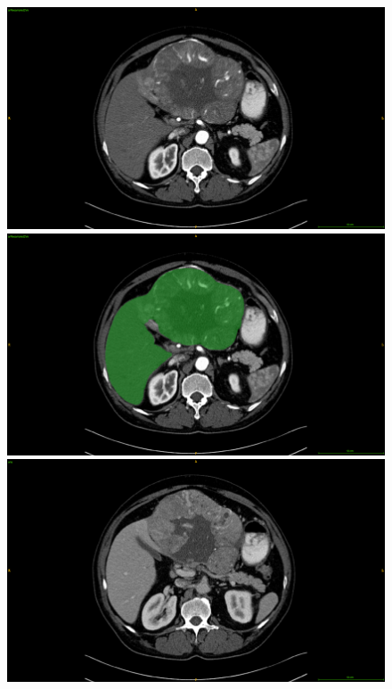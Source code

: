 \begin{figure}[ht!]
	\centering
	\begin{minipage}{0.45\linewidth}
		\includegraphics[width=0.9\linewidth]{../HistologicalGradePrediction/images/ResizeTCIA_CECTLiver_prediction_TCGA-DD-A11A_slice42_AR_raw}
	\end{minipage}
	\hspace{0.3cm}
	\begin{minipage}{0.45\linewidth}
		\includegraphics[width=0.9\linewidth]{../HistologicalGradePrediction/images/ResizeTCIA_CECTLiver_prediction_TCGA-DD-A11A_slice42_AR_green_liver}
	\end{minipage}
	\vspace{0.8cm}
	\begin{minipage}{0.45\linewidth}
		\includegraphics[width=0.9\linewidth]{../HistologicalGradePrediction/images/ResizeTCIA_CECTLiver_prediction_TCGA-DD-A11A_slice42_raw}

\end{minipage}
\end{figure}
